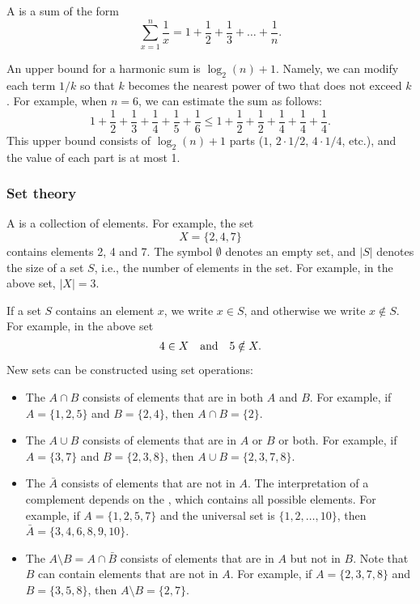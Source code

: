 
A  is a sum of the form
\[ \sum_{x=1}^n \frac{1}{x} = 1+\frac{1}{2}+\frac{1}{3}+\ldots+\frac{1}{n}.\]

An upper bound for a harmonic sum is $\log_2(n)+1$.
Namely, we can
modify each term $1/k$ so that $k$ becomes
the nearest power of two that does not exceed $k$.
For example, when $n=6$, we can estimate
the sum as follows:
\[ 1+\frac{1}{2}+\frac{1}{3}+\frac{1}{4}+\frac{1}{5}+\frac{1}{6} \le
1+\frac{1}{2}+\frac{1}{2}+\frac{1}{4}+\frac{1}{4}+\frac{1}{4}.\]
This upper bound consists of $\log_2(n)+1$ parts
($1$, $2 \cdot 1/2$, $4 \cdot 1/4$, etc.),
and the value of each part is at most 1.

\subsubsection{Set theory}


A  is a collection of elements.
For example, the set
\[X=\{2,4,7\}\]
contains elements 2, 4 and 7.
The symbol $\emptyset$ denotes an empty set,
and $|S|$ denotes the size of a set $S$,
i.e., the number of elements in the set.
For example, in the above set, $|X|=3$.

If a set $S$ contains an element $x$,
we write $x \in S$,
and otherwise we write $x \notin S$.
For example, in the above set
\[4 \in X \hspace{10px}\textrm{and}\hspace{10px} 5 \notin X.\]

\begin{samepage}
New sets can be constructed using set operations:
\begin{itemize}
\item The  $A \cap B$ consists of elements
that are in both $A$ and $B$.
For example, if $A=\{1,2,5\}$ and $B=\{2,4\}$,
then $A \cap B = \{2\}$.
\item The  $A \cup B$ consists of elements
that are in $A$ or $B$ or both.
For example, if $A=\{3,7\}$ and $B=\{2,3,8\}$,
then $A \cup B = \{2,3,7,8\}$.
\item The  $\bar A$ consists of elements
that are not in $A$.
The interpretation of a complement depends on
the , which contains all possible elements.
For example, if $A=\{1,2,5,7\}$ and the universal set is
$\{1,2,\ldots,10\}$, then $\bar A = \{3,4,6,8,9,10\}$.
\item The  $A \setminus B = A \cap \bar B$
consists of elements that are in $A$ but not in $B$.
Note that $B$ can contain elements that are not in $A$.
For example, if $A=\{2,3,7,8\}$ and $B=\{3,5,8\}$,
then $A \setminus B = \{2,7\}$.
\end{itemize}
\end{samepage}

